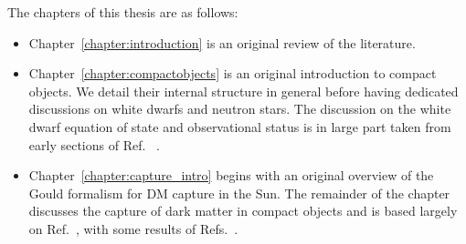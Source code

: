 \begin{preface}
The chapters of this thesis are as follows:
\begin{itemize}
    \item Chapter~\ref{chapter:introduction} is an original review of the literature.
    \item Chapter~\ref{chapter:compactobjects} is an original introduction to compact objects. We detail their internal structure in general before having dedicated discussions on white dwarfs and neutron stars. The discussion on the white dwarf equation of state and observational status is in large part taken from early sections of Ref.~\cite{Bell:2021fye_oct_Improvedtreatmentdark} .
    \item Chapter~\ref{chapter:capture_intro} begins with an original overview of the Gould formalism for DM capture in the Sun. The remainder of the chapter discusses the capture of dark matter in compact objects and is based largely on Ref.~\cite{Bell:2020jou_sep_ImprovedTreatmentDark}, with some results of Refs.~\cite{Bell:2020lmm_mar_ImprovedTreatmentDark, Anzuini:2021lnv_nov_Improvedtreatmentdark}. 
\end{itemize}
\end{preface}
